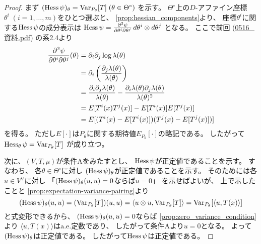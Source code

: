 \documentclass[report]{jlreq}
\begin{document}
\begin{proof}
    まず
    $(\operatorname{Hess} \psi)_\theta = \operatorname{Var}_{P_\theta}[T] \;
        (\theta \in \Theta^\circ)$
    を示す。
    $\Theta^\circ$上の$D$-アファイン座標
    $\theta^i \; (i = 1, \dots, m)$をひとつ選ぶと、
    \cref{prop:hessian_components}より、
    座標$\theta^i$に関する$\operatorname{Hess} \psi$の成分表示は
    $\operatorname{Hess}\psi
        = \frac{\partial^2 \psi}{\partial \theta^i \partial \theta^j}
        \, d\theta^i \otimes d\theta^j$
    となる。
    ここで前回 (\url{0516_資料.pdf}) の系2.4より
    \begin{alignat}{1}
        \frac{\partial^2 \psi}{\partial \theta^i \partial \theta^j}(\theta)
            &=
                \partial_i \partial_j \log \lambda(\theta)
                \\
            &=
                \partial_i \left({
                    \frac{\partial_j \lambda(\theta)}{\lambda(\theta)}
                }\right)
                \\
            &=
                \frac{
                    \partial_i \partial_j \lambda(\theta)
                }{
                    \lambda(\theta)
                }
                -
                \frac{
                    \partial_i \lambda(\theta)
                    \partial_j \lambda(\theta)
                }{
                    \lambda(\theta)^2
                }
                \\
            &=
                E[T^i(x) T^j(x)]
                -
                E[T^i(x)]
                E[T^j(x)]
                \\
            &=
                E[
                    (T^i(x) - E[T^i(x)])
                    (T^j(x) - E[T^j(x)])
                ]
    \end{alignat}
    を得る。
    ただし$E[\cdot]$は$P_\theta$に関する期待値$E_{P_\theta}[\cdot]$の略記である。
    したがって
    $\operatorname{Hess}_\theta \psi = \operatorname{Var}_{P_\theta}[T]$
    が成り立つ。

    次に、$(V, T, \mu)$が条件Aをみたすとし、
    $\operatorname{Hess}\psi$が正定値であることを示す。
    すなわち、
    各$\theta \in \Theta^\circ$に対し
    $(\operatorname{Hess}\psi)_\theta$が正定値であることを示す。
    そのためには各$u \in V^\vee$に対し
    「$(\operatorname{Hess}\psi)_\theta(u, u) = 0$ならば$u = 0$」
    を示せばよいが、
    上で示したことと
    \cref{prop:expectation-variance-pairing}より
    \begin{equation}
        (\operatorname{Hess}\psi)_\theta(u, u)
            = (\operatorname{Var}_{P_\theta}[T])(u, u)
            = \langle u \otimes u, \operatorname{Var}_{P_\theta}[T] \rangle
            = \operatorname{Var}_{P_\theta}[\langle u, T(x) \rangle]
    \end{equation}
    と式変形できるから、
    $(\operatorname{Hess}\psi)_\theta(u, u) = 0$ならば
    \cref{prop:zero_variance_condition}より
    $\langle u, T(x) \rangle$は$\text{a.e.}$定数であり、
    したがって条件Aより$u = 0$となる。
    よって$(\operatorname{Hess}\psi)_\theta$は正定値である。
    したがって$\operatorname{Hess}\psi$は正定値である。
\end{proof}
\end{document}
